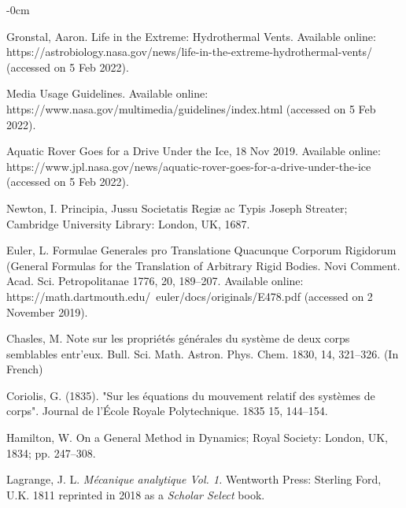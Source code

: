 \documentclass[applsci,article,submit,pdftex,moreauthors]{Definitions/mdpi}
\begin{document}
\begin{adjustwidth}{-\extralength}{0cm}


\begin{thebibliography}{999}

Gronstal, Aaron. Life in the Extreme: Hydrothermal Vents. Available online: https://astrobiology.nasa.gov/news/life-in-the-extreme-hydrothermal-vents/ (accessed on 5 Feb 2022).

Media Usage Guidelines. Available online: https://www.nasa.gov/multimedia/guidelines/index.html (accessed on 5 Feb 2022).

Aquatic Rover Goes for a Drive Under the Ice, 18 Nov 2019. Available online: https://www.jpl.nasa.gov/news/aquatic-rover-goes-for-a-drive-under-the-ice (accessed on 5 Feb 2022).

Newton, I. Principia, Jussu Societatis Regiæ ac Typis Joseph Streater; Cambridge University Library: London, UK, 1687.

Euler, L. Formulae Generales pro Translatione Quacunque Corporum Rigidorum (General Formulas for the Translation of Arbitrary Rigid Bodies. Novi Comment. Acad. Sci. Petropolitanae 1776, 20, 189–207. Available online: https://math.dartmouth.edu/~euler/docs/originals/E478.pdf (accessed on 2 November 2019).

Chasles, M. Note sur les propriétés générales du système de deux corps semblables entr’eux. Bull. Sci. Math. Astron. Phys. Chem. 1830, 14, 321–326. (In French)

Coriolis, G. (1835). "Sur les équations du mouvement relatif des systèmes de corps". Journal de l'École Royale Polytechnique. 1835 15, 144–154.

Hamilton, W. On a General Method in Dynamics; Royal Society: London, UK, 1834; pp. 247–308.

Lagrange, J. L. {\em Mécanique analytique Vol. 1.} Wentworth Press: Sterling Ford, U.K. 1811 reprinted in 2018 as a {\em Scholar Select} book. 


\end{thebibliography}
\end{adjustwidth}
\end{document}
